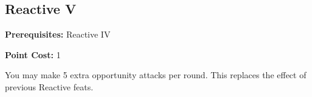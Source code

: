 \subsection{Reactive V}\label{feat:reactive5}

\noindent
\textbf{Prerequisites:} Reactive IV

\noindent
\textbf{Point Cost:} 1

You may make 5 extra opportunity attacks per round. This replaces the effect
of previous Reactive feats.

